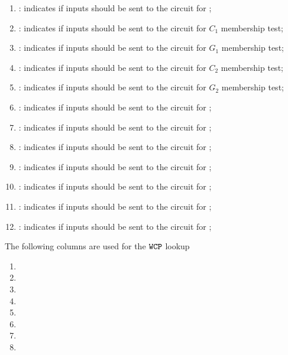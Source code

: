 \begin{enumerate}[resume]
    \item
        \both{\csPointEvaluation}:
        indicates if inputs should be sent to the circuit for ;
    \item
        \both{\csCOne}:
        indicates if inputs should be sent to the circuit for $C_1$ membership test;
    \item
        \both{\csGOne}:
        indicates if inputs should be sent to the circuit for $G_1$ membership test;
    \item
        \both{\csCTwo}:
        indicates if inputs should be sent to the circuit for $C_2$ membership test;
    \item
        \both{\csGTwo}:
        indicates if inputs should be sent to the circuit for $G_2$ membership test;
    \item
        \both{\csPairing}:
        indicates if inputs should be sent to the circuit for ;
    \item
        \both{\csGOneAdd}:
        indicates if inputs should be sent to the circuit for ;
    \item
        \both{\csGTwoAdd}:
        indicates if inputs should be sent to the circuit for ;
    \item
        \both{\csGOneMsm}:
        indicates if inputs should be sent to the circuit for ;
    \item
        \both{\csGTwoMsm}:
        indicates if inputs should be sent to the circuit for ;
    \item
        \both{\csMapFpToGOne}:
        indicates if inputs should be sent to the circuit for ;
    \item
        \both{\csMapFpTwoToGTwo}:
        indicates if inputs should be sent to the circuit for ;
\end{enumerate}
The following columns are used for the $\texttt{WCP}$ lookup
\begin{multicols}{2}
    \begin{enumerate}[resume]
        \item \wcpFlag
        \item \wcpArgOneHi
        \item \wcpArgOneLo
        \item \wcpArgTwoHi
        \item \wcpArgTwoLo
        \item \wcpRes
        \item \wcpInst
        \item[\vspace{\fill}]
    \end{enumerate}
\end{multicols}
